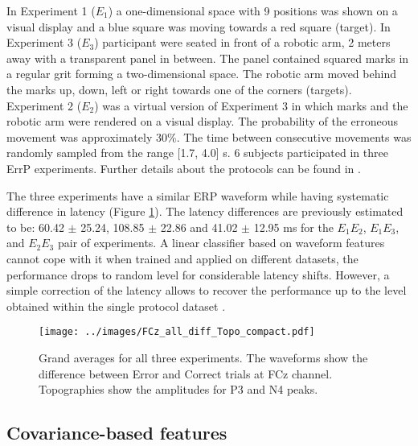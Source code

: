 \documentclass[12pt]{iopart}
\begin{document}
In Experiment 1 ($E_1$) a one-dimensional space with 9 positions was shown on a visual display and
a blue square was moving towards a red square (target). In Experiment 3 ($E_3$) participant were seated
in front of a robotic arm, 2 meters away with a transparent panel in between.
The panel contained squared marks in a regular grit forming a two-dimensional space.
The robotic arm moved behind the marks up, down, left or right 
towards one of the corners (targets).
Experiment 2 ($E_2$) was a virtual version of Experiment 3 in which marks and the robotic arm
were rendered on a visual display.
The probability of the erroneous
movement was approximately 30\%. The time between consecutive movements was randomly sampled
from the range [1.7, 4.0] s. 
6 subjects participated in three ErrP experiments.
Further details about the protocols can be found in \cite{iturrate_latency_2014-1}.

The three experiments have a similar ERP waveform 
while having systematic difference in latency (Figure \ref{fig:FCz}).
The latency differences are previously estimated to be:
60.42 $\pm$ 25.24, 108.85 $\pm$ 22.86 and 41.02 $\pm$ 12.95 ms
for the $E_1 E_2$, $E_1 E_3$, and $E_2 E_3$ pair of experiments.
A linear classifier
based on waveform features cannot cope with it when trained and applied
on different datasets, the performance drops to random level
for considerable latency shifts. However, a simple correction of 
the latency allows to recover the performance up to the level
obtained within the single protocol dataset  \cite{iturrate_latency_2014-1}.


\begin{figure}[!t]
    \texttt{[image: ../images/FCz\_all\_diff\_Topo\_compact.pdf]}
\caption{Grand averages for all three experiments. The waveforms show the difference between
Error and Correct trials at FCz channel. Topographies show the amplitudes for P3 and N4 peaks.}
\label{fig:FCz}
\end{figure}


\subsection{Covariance-based features}
\end{document}
